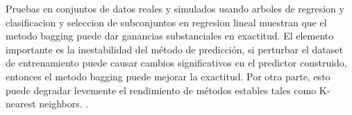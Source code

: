 Pruebas en conjuntos de datos reales y simulados usando arboles de regresion y clasificacion y seleccion de subconjuntos en regresion lineal muestran que el metodo bagging puede dar ganancias substanciales en exactitud.
El elemento importante es la inestabilidad del método de predicción, si perturbar el dataset de entrenamiento puede causar cambios significativos en el predictor construido, entonces el metodo bagging puede mejorar la exactitud. Por otra parte, esto puede degradar levemente el rendimiento de métodos estables tales como K-nearest neighbors.
\cite{BreimanLMachineLearning1996}.
